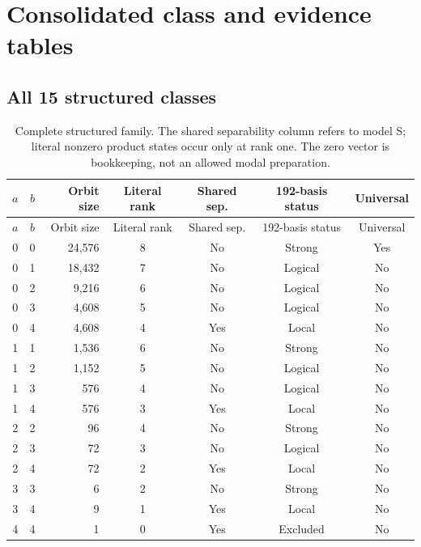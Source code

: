 \documentclass[11pt,a4paper]{article}
\theoremstyle{definition}\newtheorem{definition}[theorem]{Definition}
\newcommand{\modelS}{\textsf{S}}
\begin{document}
\section{Consolidated class and evidence tables}
\subsection{All 15 structured classes}
\begin{longtable}{@{}ccrcccc@{}}
\caption{Complete structured family. The shared separability column refers to model \modelS; literal nonzero product states occur only at rank one. The zero vector is bookkeeping, not an allowed modal preparation.}\label{tab:classes}\\
\toprule $a$ & $b$ & Orbit size & Literal rank & Shared sep. & 192-basis status & Universal\\\midrule\endfirsthead
\toprule $a$ & $b$ & Orbit size & Literal rank & Shared sep. & 192-basis status & Universal\\\midrule\endhead
0 & 0 & 24,576 & 8 & No & Strong & Yes\\
0 & 1 & 18,432 & 7 & No & Logical & No\\
0 & 2 & 9,216 & 6 & No & Logical & No\\
0 & 3 & 4,608 & 5 & No & Logical & No\\
0 & 4 & 4,608 & 4 & Yes & Local & No\\
1 & 1 & 1,536 & 6 & No & Strong & No\\
1 & 2 & 1,152 & 5 & No & Logical & No\\
1 & 3 & 576 & 4 & No & Logical & No\\
1 & 4 & 576 & 3 & Yes & Local & No\\
2 & 2 & 96 & 4 & No & Strong & No\\
2 & 3 & 72 & 3 & No & Logical & No\\
2 & 4 & 72 & 2 & Yes & Local & No\\
3 & 3 & 6 & 2 & No & Strong & No\\
3 & 4 & 9 & 1 & Yes & Local & No\\
4 & 4 & 1 & 0 & Yes & Excluded & No\\
\bottomrule\end{longtable}
\end{document}

